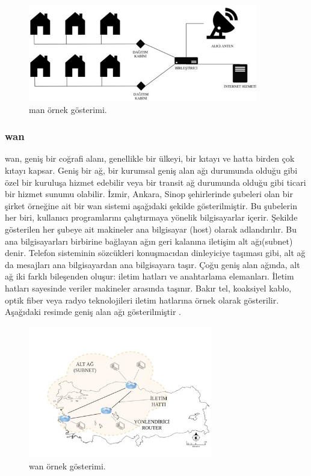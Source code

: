 \begin{figure}[htbp]
\centerline{\includegraphics[width=10cm]{Resim/Sekil3-7.jpg}}
\caption{\gls{man} örnek gösterimi.}
\label{fig:figure13}
\end{figure}

\subsubsection{\gls{wan}}

\gls{wan}, geniş bir coğrafi alanı, genellikle bir ülkeyi, bir kıtayı ve hatta birden çok kıtayı kapsar. Geniş bir ağ, bir kurumsal geniş alan ağı durumunda olduğu gibi özel bir kuruluşa hizmet edebilir veya bir transit ağ durumunda olduğu gibi ticari bir hizmet sunumu olabilir.
İzmir, Ankara, Sinop şehirlerinde şubeleri olan bir şirket örneğine ait bir \gls{wan} sistemi aşağıdaki şekilde gösterilmiştir. Bu şubelerin her biri, kullanıcı programlarını çalıştırmaya yönelik bilgisayarlar içerir. Şekilde gösterilen her şubeye ait makineler ana bilgisayar (host) olarak adlandırılır. Bu ana bilgisayarları birbirine bağlayan ağın geri kalanına iletişim alt ağı(subnet) denir. Telefon sisteminin sözcükleri konuşmacıdan dinleyiciye taşıması gibi, alt ağ da mesajları ana bilgisayardan ana bilgisayara taşır.
Çoğu geniş alan ağında, alt ağ iki farklı bileşenden oluşur: iletim hatları ve anahtarlama elemanları. İletim hatları sayesinde veriler makineler arasında taşınır. Bakır tel, koaksiyel kablo, optik fiber veya radyo teknolojileri iletim hatlarına örnek olarak gösterilir. Aşağıdaki resimde geniş alan ağı gösterilmiştir \cite{tanenbaum2002computer}.

\begin{figure}[htbp]
\centerline{\includegraphics[width=8cm]{Resim/Sekil3-8.jpg}}
\caption{\gls{wan} örnek gösterimi.}
\label{fig:figure14}
\end{figure}


